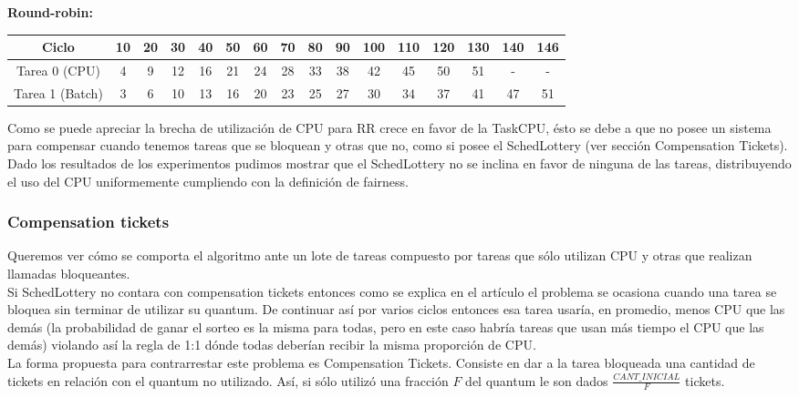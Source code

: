 \begin{flushleft}
\textbf{Round-robin:}\end{flushleft}
\begin{center}
\begin{tabular}{|c|c|c|c|c|c|c|c|c|c|c|c|c|c|c|c|}
\hline
Ciclo & 10 & 20 & 30 & 40 & 50 & 60 & 70 & 80 & 90 & 100 & 110 & 120 & 130 & 140 & 146 \\ 
\hline
\hline
Tarea 0 (CPU) & 4 & 9 & 12 & 16 & 21 & 24 & 28 & 33 & 38 & 42 & 45 & 50 & 51 & - & -\\
\hline
Tarea 1 (Batch) & 3 & 6 & 10 & 13 & 16 & 20 & 23 & 25 & 27 & 30 & 34 & 37 & 41 & 47 & 51\\ 
\hline
\end{tabular}\end{center}

Como se puede apreciar la brecha de utilización de CPU para RR crece en favor de la TaskCPU, ésto se debe
a que no posee un sistema para compensar cuando tenemos tareas que se bloquean y otras que no, como si posee
el SchedLottery (ver sección Compensation Tickets).\\

Dado los resultados de los experimentos pudimos mostrar que el SchedLottery no se inclina en favor de ninguna de las tareas, distribuyendo el uso del CPU
uniformemente cumpliendo con la definición de fairness.

\subsubsection{Compensation tickets}

Queremos ver cómo se comporta el algoritmo ante un lote de tareas compuesto por
tareas que sólo utilizan CPU y otras que realizan llamadas bloqueantes.\\

Si SchedLottery no contara con compensation tickets entonces como se explica en el artículo \cite[Sec. 3.4]{SchedLottery} el problema se 
ocasiona cuando una tarea se bloquea sin terminar de utilizar su quantum.
De continuar así por varios ciclos entonces esa tarea usaría, en promedio, menos CPU que las demás
(la probabilidad de ganar el sorteo es la misma para todas, pero en este caso habría tareas que
usan más tiempo el CPU que las demás)
violando así la regla de 1:1 dónde todas deberían recibir la misma proporción de CPU.\\

La forma propuesta para contrarrestar este problema es Compensation Tickets. 
Consiste en dar a la tarea bloqueada una cantidad de tickets en relación con el quantum no utilizado.
Así, si sólo utilizó una fracción $F$ del quantum le son dados $\frac{CANT\_INICIAL}{F}$ tickets.\\


